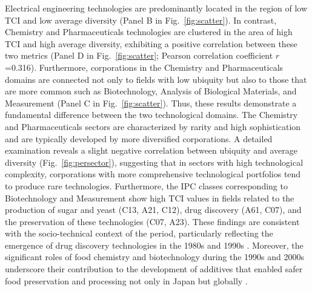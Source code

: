 Electrical engineering technologies are predominantly located in the region of low TCI and low average diversity (Panel B in Fig.~\ref{fig:scatter}). In contrast, Chemistry and Pharmaceuticals technologies are clustered in the area of high TCI and high average diversity, exhibiting a positive correlation between these two metrics (Panel D in Fig.~\ref{fig:scatter}; Pearson correlation coefficient $r$=0.316). Furthermore, corporations in the Chemistry and Pharmaceuticals domains are connected not only to fields with low ubiquity but also to those that are more common such as Biotechnology, Analysis of Biological Materials, and Measurement (Panel C in Fig.~\ref{fig:scatter}).
Thus, these results demonstrate a fundamental difference between the two technological domains. The Chemistry and Pharmaceuticals sectors are characterized by rarity and high sophistication and are typically developed by more diversified corporations. A detailed examination reveals a slight negative correlation between ubiquity and average diversity (Fig.~\ref{fig:persector}), suggesting that in sectors with high technological complexity, corporations with more comprehensive technological portfolios tend to produce rare technologies.
Furthermore, the IPC classes corresponding to Biotechnology and Measurement show high TCI values in fields related to the production of sugar and yeast (C13, A21, C12), drug discovery (A61, C07), and the preservation of these technologies (C07, A23). These findings are consistent with the socio-technical context of the period, particularly reflecting the emergence of drug discovery technologies in the 1980s and 1990s \cite{Sakakibara2014,Nakamura2022}. Moreover, the significant roles of food chemistry and biotechnology during the 1990s and 2000s underscore their contribution to the development of additives that enabled safer food preservation and processing not only in Japan but globally \cite{Bhatia2018,Murakami2024}.
